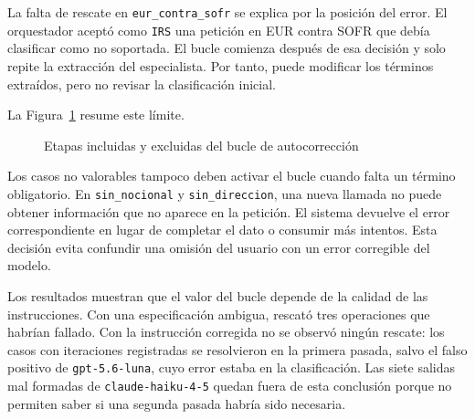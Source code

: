 La falta de rescate en \texttt{eur\_contra\_sofr} se explica por la posición del error. El orquestador aceptó como \texttt{IRS} una petición en EUR contra SOFR que debía clasificar como no soportada. El bucle comienza después de esa decisión y solo repite la extracción del especialista. Por tanto, puede modificar los términos extraídos, pero no revisar la clasificación inicial.

La Figura~\ref{fig:alcance_bucle} resume este límite.

\begin{figure}[H]
    \centering
    \caption[Alcance del bucle de autocorrección]{Etapas incluidas y excluidas del bucle de autocorrección}
    \label{fig:alcance_bucle}
\end{figure}

Los casos no valorables tampoco deben activar el bucle cuando falta un término obligatorio. En \texttt{sin\_nocional} y \texttt{sin\_direccion}, una nueva llamada no puede obtener información que no aparece en la petición. El sistema devuelve el error correspondiente en lugar de completar el dato o consumir más intentos. Esta decisión evita confundir una omisión del usuario con un error corregible del modelo.

Los resultados muestran que el valor del bucle depende de la calidad de las instrucciones. Con una especificación ambigua, rescató tres operaciones que habrían fallado. Con la instrucción corregida no se observó ningún rescate: los casos con iteraciones registradas se resolvieron en la primera pasada, salvo el falso positivo de \texttt{gpt-5.6-luna}, cuyo error estaba en la clasificación. Las siete salidas mal formadas de \texttt{claude-haiku-4-5} quedan fuera de esta conclusión porque no permiten saber si una segunda pasada habría sido necesaria.

